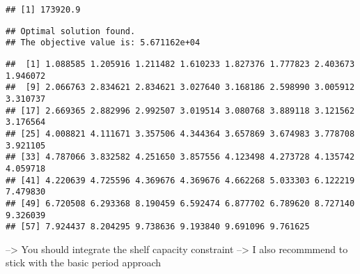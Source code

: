 \documentclass[
]{article}
\newenvironment{Shaded}{\begin{snugshade}}{\end{snugshade}}
\newcommand{\CommentTok}[1]{\textcolor[rgb]{0.56,0.35,0.01}{\textit{#1}}}
\newcommand{\DataTypeTok}[1]{\textcolor[rgb]{0.13,0.29,0.53}{#1}}
\newcommand{\DecValTok}[1]{\textcolor[rgb]{0.00,0.00,0.81}{#1}}
\newcommand{\KeywordTok}[1]{\textcolor[rgb]{0.13,0.29,0.53}{\textbf{#1}}}
\newcommand{\NormalTok}[1]{#1}
\newcommand{\OperatorTok}[1]{\textcolor[rgb]{0.81,0.36,0.00}{\textbf{#1}}}
\newcommand{\StringTok}[1]{\textcolor[rgb]{0.31,0.60,0.02}{#1}}
\begin{document}
\begin{Shaded}
\end{Shaded}

\begin{verbatim}
## [1] 173920.9
\end{verbatim}

\begin{Shaded}
\end{Shaded}

\begin{verbatim}
## Optimal solution found.
## The objective value is: 5.671162e+04
\end{verbatim}

\begin{Shaded}
\end{Shaded}

\begin{verbatim}
##  [1] 1.088585 1.205916 1.211482 1.610233 1.827376 1.777823 2.403673 1.946072
##  [9] 2.066763 2.834621 2.834621 3.027640 3.168186 2.598990 3.005912 3.310737
## [17] 2.669365 2.882996 2.992507 3.019514 3.080768 3.889118 3.121562 3.176564
## [25] 4.008821 4.111671 3.357506 4.344364 3.657869 3.674983 3.778708 3.921105
## [33] 4.787066 3.832582 4.251650 3.857556 4.123498 4.273728 4.135742 4.059718
## [41] 4.220639 4.725596 4.369676 4.369676 4.662268 5.033303 6.122219 7.479830
## [49] 6.720508 6.293368 8.190459 6.592474 6.877702 6.789620 8.727140 9.326039
## [57] 7.924437 8.204295 9.738636 9.193840 9.691096 9.761625
\end{verbatim}

--\textgreater{} You should integrate the shelf capacity constraint
--\textgreater{} I also recommmend to stick with the basic period
approach
\end{document}

